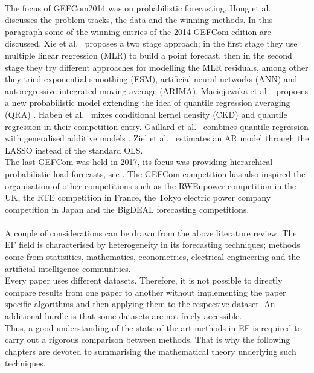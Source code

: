 \\
The focus of GEFCom2014 was on probabilistic forecasting, Hong et al.\ \cite{hong2016probabilistic} discusses the problem tracks, the data and the winning methods.
In this paragraph some of the winning entries of the 2014 GEFCom edition are discussed.
Xie et al.\ \cite{xie2016gefcom2014} proposes a two stage approach; in the first stage they use multiple linear regression (MLR) to build a point forecast, then in the second stage they try different approaches for modelling the MLR residuals, among other they tried exponential smoothing (ESM), artificial neural networks (ANN) and autoregressive integrated moving average (ARIMA). 
Maciejowska et al.\ \cite{maciejowska2016hybrid} proposes a new probabilistic model extending the idea of quantile regression averaging (QRA) \cite{nowotarski2015computing}.
Haben et al.\ \cite{haben2016hybrid} mixes conditional kernel density (CKD) and quantile regression in their competition entry.
Gaillard et al.\ \cite{gaillard2016additive,gaillardasemi} combines quantile regression with generalised additive models \cite{hastie2017generalized}.
Ziel et al.\ \cite{ziel2016lasso} estimates an AR model through the LASSO \cite{tibshirani1996regression} instead of the standard OLS.
\\
The last GEFCom was held in 2017, its focus was providing hierarchical probabilistic load forecasts, see \cite{hong2019global}. The GEFCom competition has also inspired the organisation of other competitions such as the RWEnpower competition in the UK, the RTE competition in France, the Tokyo electric power company competition in Japan and the BigDEAL forecasting competitions.
\\
\\
A couple of considerations can be drawn from the above literature review.
The EF field is characterised by heterogeneity in its forecasting techniques; methods come from statisitics, mathematics, econometrics, electrical engineering and the artificial intelligence communities.
\\
Every paper uses different datasets.
Therefore, it is not possible to directly compare results from one paper to another without implementing the paper specific algorithms and then applying them to the respective dataset. An additional hurdle is that some datasets are not freely accessible.
\\
Thus, a good understanding of the state of the art methods in EF is required to carry out a rigorous comparison between methods.
That is why the following chapters are devoted to summarising the mathematical theory underlying such techniques.

